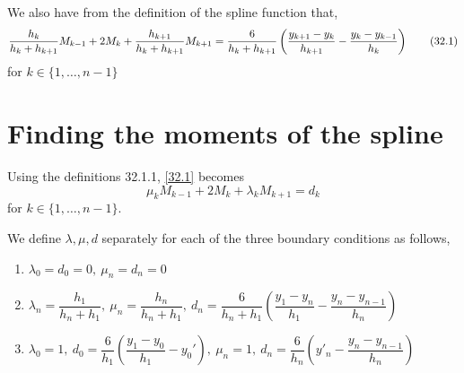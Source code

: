 We also have from the definition of the spline function that,
\[ \dfrac{h_k}{h_k + h_{k+1}}M_{k-1} + 2M_k + \dfrac{h_{k+1}}{h_k + h_{k+1}}M_{k+1} = \dfrac{6}{h_k + h_{k+1}}\left(\dfrac{y_{k+1}-y_k}{h_{k+1}} - \dfrac{y_{k}-y_{k-1}}{h_{k}}\right) \eqlab{32.1}\]
for $ k \in \{1, \dots, n-1\} $
\pagebreak

\section{Finding the moments of the spline}
Using the definitions 32.1.1, \eqref{32.1} becomes
\[ \mu_kM_{k-1} + 2M_k + \lambda_kM_{k+1} = d_k \]
for $ k \in \{1, \dots, n-1\} $.

We define $ \lambda, \mu, d $ separately for each of the three boundary conditions as follows,
\begin{enumerate}[label=Case (\alph*):]
	\item $ \lambda_0 = d_0 = 0, \ \mu_n = d_n = 0 $
	
	\item $ \lambda_n = \dfrac{h_1}{h_n + h_1}, \ \mu_n = \dfrac{h_n}{h_n + h_1}, \ d_n = \dfrac{6}{h_n + h_1}\left(\dfrac{y_1-y_n}{h_1} - \dfrac{y_n-y_{n-1}}{h_n}\right) $
	
	\item $ \lambda_0 = 1, \ d_0 = \dfrac{6}{h_1}\left(\dfrac{y_1-y_0}{h_1} - y_0'\right), \ \mu_n = 1, \ d_n = \dfrac{6}{h_n}\left(y'_n - \dfrac{y_n-y_{n-1}}{h_n}\right) $
\end{enumerate}

